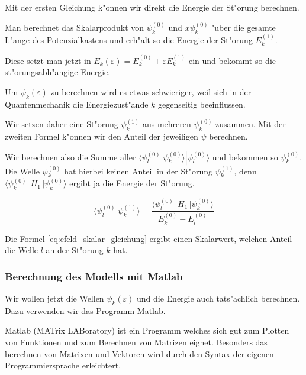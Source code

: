 \begin{refsection}
Mit der ersten Gleichung k"onnen wir direkt die Energie der St"orung berechnen.

Man berechnet das Skalarprodukt von $\psi_k^{(0)}$ und $x \psi_k^{(0)}$ "uber 
die gesamte L"ange des Potenzialkastens und erh"alt so die Energie der St"orung $E_k^{(1)}$.

Diese setzt man jetzt in $E_k(\varepsilon)=E_k^{(0)} + \varepsilon E_k^{(1)}$ ein und bekommt so die st"orungsabh"angige Energie.

Um $\psi_k(\varepsilon)$ zu berechnen wird es etwas schwieriger, weil sich in der Quantenmechanik die Energiezust"ande $k$ gegenseitig beeinflussen.

Wir setzen daher eine St"orung $\psi_k^{(1)}$ aus mehreren $\psi_k^{(0)}$ zusammen.
Mit der zweiten Formel k"onnen wir den Anteil der jeweiligen $\psi$ berechnen.

Wir berechnen also die Summe aller $\langle\psi_l^{(0)}|\psi_k^{(0)}\rangle|\psi_l^{(0)}\rangle$
und bekommen so $\psi_k^{(0)}$.
Die Welle $\psi_k^{(0)}$ hat hierbei keinen Anteil in der St"orung $\psi_k^{(1)}$,
denn $\langle \psi_k^{(0)}|\, H_1 \,|\psi_k^{(0)}\rangle$ ergibt ja die Energie der St"orung.







\begin{equation}
  \label{eq:efeld_skalar_gleichung}
  \langle\psi_l^{(0)}|\psi_k^{(1)}\rangle
      =
  \frac{\langle \psi_l^{(0)}|\, H_1 \,|\psi_k^{(0)}\rangle}{E_k^{(0)}-E_l^{(0)}}
\end{equation}

Die Formel \ref{eq:efeld_skalar_gleichung} ergibt einen Skalarwert, welchen Anteil die Welle $l$ an der St"orung $k$ hat.









\subsubsection{Berechnung des Modells mit Matlab}

Wir wollen jetzt die Wellen $\psi_k(\varepsilon)$ und die Energie auch tats"achlich berechnen.
Dazu verwenden wir das Programm Matlab.

Matlab (MATrix LABoratory) ist ein Programm welches sich gut zum Plotten von Funktionen
und zum Berechnen von Matrizen eignet.
Besonders das berechnen von Matrixen und Vektoren wird durch den Syntax der eigenen Programmiersprache erleichtert.


\end{refsection}
